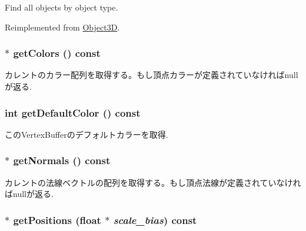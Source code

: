 Find all objects by object type. 

Reimplemented from \hyperlink{classm3g_1_1Object3D_4dadb21b568b0230fac106f15040138c}{Object3D}.\hypertarget{classm3g_1_1VertexBuffer_e3bdc8503242a6d278230352d03e5893}{
\subsubsection[{getColors}]{ $\ast$ getColors () const}}
\label{classm3g_1_1VertexBuffer_e3bdc8503242a6d278230352d03e5893}


カレントのカラー配列を取得する。もし頂点カラーが定義されていなければnullが返る. \hypertarget{classm3g_1_1VertexBuffer_4e33b93a98ce0632d51e7ae775ae5b1e}{
\subsubsection[{getDefaultColor}]{\setlength{\rightskip}{0pt plus 5cm}int getDefaultColor () const}}
\label{classm3g_1_1VertexBuffer_4e33b93a98ce0632d51e7ae775ae5b1e}


このVertexBufferのデフォルトカラーを取得. \hypertarget{classm3g_1_1VertexBuffer_0f4341d1215ff8f4efeaa40a21327c0c}{
\subsubsection[{getNormals}]{ $\ast$ getNormals () const}}
\label{classm3g_1_1VertexBuffer_0f4341d1215ff8f4efeaa40a21327c0c}


カレントの法線ベクトルの配列を取得する。もし頂点法線が定義されていなければnullが返る. \hypertarget{classm3g_1_1VertexBuffer_5ca059361f9f834dd00b5d595bf3df0b}{
\subsubsection[{getPositions}]{ $\ast$ getPositions (float $\ast$ {\em scale\_\-bias}) const}}
\label{classm3g_1_1VertexBuffer_5ca059361f9f834dd00b5d595bf3df0b}


